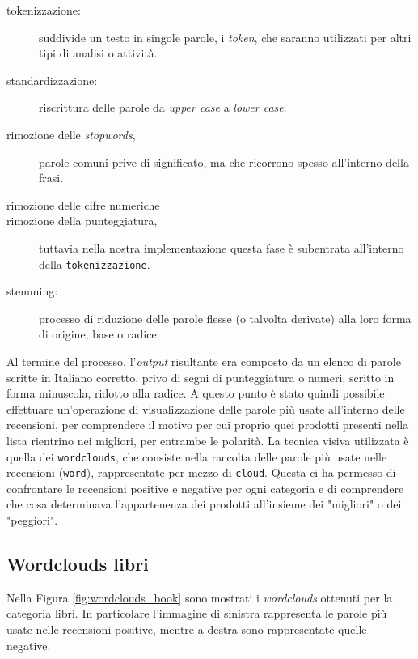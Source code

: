 \begin{description}
			\begin{description}
				\item[tokenizzazione:] suddivide un testo in singole parole, i \textit{token}, che saranno utilizzati per altri tipi di analisi o attività.
				\item[standardizzazione:] riscrittura delle parole da \textit{upper case} a \textit{lower case}. 
				\item[rimozione delle \textit{stopwords},] parole comuni prive di significato, ma che ricorrono spesso all'interno della frasi.
				\item[rimozione delle cifre numeriche]
				\item[rimozione della punteggiatura,] tuttavia nella nostra implementazione questa fase è subentrata all'interno della \verb|tokenizzazione|. 
				\item [stemming:] processo di riduzione delle parole flesse (o talvolta derivate) alla loro forma di origine, base o radice.
			\end{description}
			
			Al termine del processo, l'\textit{output} risultante era composto da un elenco di parole scritte in Italiano corretto, privo di segni di punteggiatura o numeri, scritto in forma minuscola, ridotto alla radice. A questo punto è stato quindi possibile effettuare un'operazione di visualizzazione delle parole più usate all'interno delle recensioni, per comprendere il motivo per cui proprio quei prodotti presenti nella lista rientrino nei migliori, per entrambe le polarità. La tecnica visiva utilizzata è quella dei \verb|wordclouds|, che consiste nella raccolta delle parole più usate nelle recensioni (\verb|word|), rappresentate per mezzo di \verb|cloud|. Questa ci ha permesso di confrontare le recensioni positive e negative per ogni categoria e di comprendere che cosa determinava l'appartenenza dei prodotti all'insieme dei "migliori" o dei "peggiori". 
			\end{description}

	
			\subsection{Wordclouds libri} 
				Nella Figura \ref{fig:wordclouds_book} sono mostrati i \textit{wordclouds} ottenuti per la categoria libri. In particolare l'immagine di sinistra rappresenta le parole più usate nelle recensioni positive, mentre a destra sono rappresentate quelle negative. 
				
